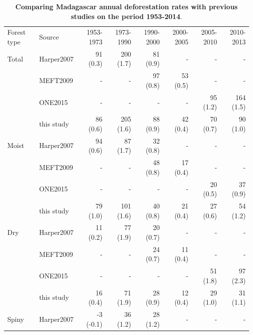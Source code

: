 \documentclass[essd, classical]{copernicus}
\begin{document}
\begin{table}[h]

  \caption{\textbf{Comparing Madagascar annual deforestation rates
      with previous studies on the period 1953-2014}.}
  \label{tab:comp_defor}
  
  \begin{tabular}{@{}llrrrrrr@{}}
    \tophline
    Forest type & Source & 1953-1973 & 1973-1990 & 1990-2000 & 2000-2005 &
                                                                           2005-2010 & 2010-2013\\
    \middlehline
    Total & Harper2007 & 91 (0.3) & 200 (1.7) & 81 (0.9) & - & - &
                                                                   - \\
                & MEFT2009 & - & - & 97 (0.8) & 53 (0.5) & - & - \\
                & ONE2015 & - & - & - & - & 95 (1.2) & 164 (1.5) \\
                & this study & 86 (0.6) & 205 (1.6) & 88 (0.9) & 42 (0.4) & 70 (0.7) &
                                                                                       90 (1.0) \\
    Moist & Harper2007 & 94 (0.6) & 87 (1.7) & 32 (0.8) & - & - &
                                                                  - \\
                & MEFT2009 & - & - & 48 (0.8) & 17 (0.4) & - & - \\
                & ONE2015 & - & - & - & - & 20 (0.5) & 37 (0.9) \\
                & this study & 79 (1.0) & 101 (1.6) & 40 (0.8) & 21 (0.4) & 27 (0.6) &
                                                                                       54 (1.2) \\
    Dry & Harper2007 & 11 (0.2) & 77 (1.9) & 20 (0.7) & - & - &
                                                                - \\
                & MEFT2009 & - & - & 24 (0.7) & 11 (0.4) & - & - \\
                & ONE2015 & - & - & - & - & 51 (1.8) & 97 (2.3) \\
                & this study & 16 (0.4) & 71 (1.9) & 28 (0.9) & 12 (0.4) & 29 (1.0) & 31
                                                                                      (1.1) \\
    Spiny & Harper2007 & -3 (-0.1) & 36 (1.2) & 28 (1.2) & - & - &
                                                                   - \\

\end{tabular}
\end{table}
\end{document}
